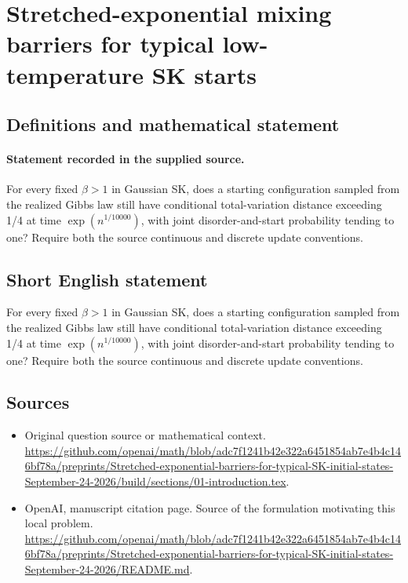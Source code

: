\documentclass[11pt]{article}
\begin{document}
\section*{Stretched-exponential mixing barriers for typical low-temperature SK starts}\label{30007394}
\subsection{Definitions and mathematical statement}
\paragraph{Statement recorded in the supplied source.}
For every fixed $\beta >1$ in Gaussian SK, does a starting configuration sampled from the realized Gibbs law still have conditional total-variation distance exceeding 1/4 at time $\exp (n^{1/10000})$, with joint disorder-and-start probability tending to one? Require both the source continuous and discrete update conventions.
\subsection{Short English statement}
For every fixed $\beta >1$ in Gaussian SK, does a starting configuration sampled from the realized Gibbs law still have conditional total-variation distance exceeding 1/4 at time $\exp (n^{1/10000})$, with joint disorder-and-start probability tending to one? Require both the source continuous and discrete update conventions.
\subsection{Sources}
\begin{itemize}
\item[S1] Original question source or mathematical context.
\url{https://github.com/openai/math/blob/adc7f1241b42e322a6451854ab7e4b4c146bf78a/preprints/Stretched-exponential-barriers-for-typical-SK-initial-states-September-24-2026/build/sections/01-introduction.tex}.
\item[S2] OpenAI, manuscript citation page. Source of the formulation motivating this local problem.
\url{https://github.com/openai/math/blob/adc7f1241b42e322a6451854ab7e4b4c146bf78a/preprints/Stretched-exponential-barriers-for-typical-SK-initial-states-September-24-2026/README.md}.
\end{itemize}
\end{document}
